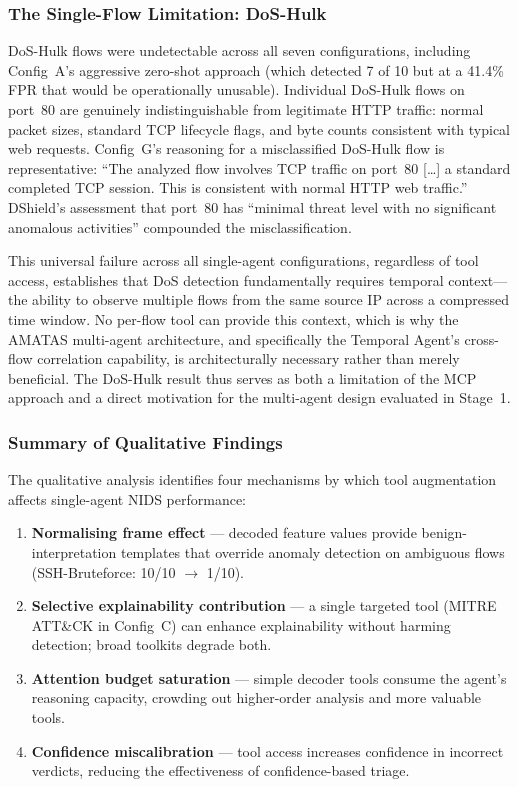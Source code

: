 \documentclass[../main.tex]{subfiles}
\begin{document}
\subsubsection{The Single-Flow Limitation: DoS-Hulk}

DoS-Hulk flows were undetectable across all seven configurations, including Config~A's aggressive zero-shot approach (which detected 7 of 10 but at a 41.4\% FPR that would be operationally unusable). Individual DoS-Hulk flows on port~80 are genuinely indistinguishable from legitimate HTTP traffic: normal packet sizes, standard TCP lifecycle flags, and byte counts consistent with typical web requests. Config~G's reasoning for a misclassified DoS-Hulk flow is representative: ``The analyzed flow involves TCP traffic on port~80 [\ldots] a standard completed TCP session. This is consistent with normal HTTP web traffic.'' DShield's assessment that port~80 has ``minimal threat level with no significant anomalous activities'' compounded the misclassification.

This universal failure across all single-agent configurations, regardless of tool access, establishes that DoS detection fundamentally requires temporal context---the ability to observe multiple flows from the same source IP across a compressed time window. No per-flow tool can provide this context, which is why the AMATAS multi-agent architecture, and specifically the Temporal Agent's cross-flow correlation capability, is architecturally necessary rather than merely beneficial. The DoS-Hulk result thus serves as both a limitation of the MCP approach and a direct motivation for the multi-agent design evaluated in Stage~1.

\subsubsection{Summary of Qualitative Findings}

The qualitative analysis identifies four mechanisms by which tool augmentation affects single-agent NIDS performance:

\begin{enumerate}
  \item \textbf{Normalising frame effect} --- decoded feature values provide benign-interpretation templates that override anomaly detection on ambiguous flows (SSH-Bruteforce: 10/10 $\to$ 1/10).
  \item \textbf{Selective explainability contribution} --- a single targeted tool (MITRE ATT\&CK in Config~C) can enhance explainability without harming detection; broad toolkits degrade both.
  \item \textbf{Attention budget saturation} --- simple decoder tools consume the agent's reasoning capacity, crowding out higher-order analysis and more valuable tools.
  \item \textbf{Confidence miscalibration} --- tool access increases confidence in incorrect verdicts, reducing the effectiveness of confidence-based triage.
\end{enumerate}
\end{document}
